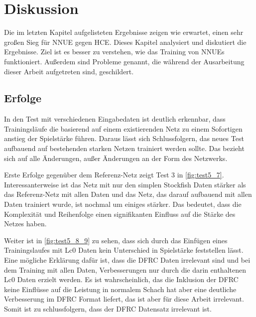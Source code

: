 \chapter{Diskussion}
\label{chap:discussion}

Die im letzten Kapitel aufgelisteten Ergebnisse zeigen wie erwartet, einen sehr großen Sieg für \ac{NNUE} gegen \ac{HCE}. Dieses Kapitel analysiert und diskutiert die Ergebnisse. Ziel ist es besser zu verstehen, wie das Training von \acp{NNUE} funktioniert. Außerdem sind Probleme genannt, die während der Ausarbeitung dieser Arbeit aufgetreten sind, geschildert.

\section{Erfolge}

In den Test mit verschiedenen Eingabedaten ist deutlich erkennbar, dass Trainingsläufe die basierend auf einem existierenden Netz zu einem Sofortigen anstieg der Spielstärke führen. Daraus lässt sich Schlussfolgern, das neues Test aufbauend auf bestehenden starken Netzen trainiert werden sollte. Das bezieht sich auf alle Änderungen, außer Änderungen an der Form des Netzwerks.

Erste Erfolge gegenüber dem Referenz-Netz zeigt Test 3 in \autoref{fig:test5_7}. Interessanterweise ist das Netz mit nur den simplen Stockfish Daten stärker als das Referenz-Netz mit allen Daten und das Netz, das darauf aufbauend mit allen Daten trainiert wurde, ist nochmal um einiges stärker. Das bedeutet, dass die Komplexität und Reihenfolge einen signifikanten Einfluss auf die Stärke des Netzes haben.

Weiter ist in \autoref{fig:test5_8_9} zu sehen, dass sich durch das Einfügen eines Trainingslaufes mit \ac{Lc0} Daten kein Unterschied in Spielstärke feststellen lässt. Eine mögliche Erklärung dafür ist, dass die \ac{DFRC} Daten irrelevant sind und bei dem Training mit allen Daten, Verbesserungen nur durch die darin enthaltenen \ac{Lc0} Daten erzielt werden. Es ist wahrscheinlich, das die Inklusion der \ac{DFRC} keine Einflüsse auf die Leistung in normalem Schach hat aber eine deutliche Verbesserung im \ac{DFRC} Format liefert, das ist aber für diese Arbeit irrelevant. Somit ist zu schlussfolgern, dass der \ac{DFRC} Datensatz irrelevant ist.

